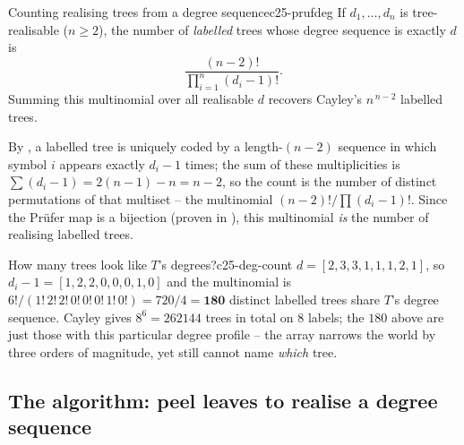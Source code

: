 \begin{proposition}{Counting realising trees from a degree sequence}{c25-prufdeg}
If $d_1,\dots,d_n$ is tree-realisable ($n\ge2$), the number of \emph{labelled} trees whose degree
sequence is exactly $d$ is
\[
  \frac{(n-2)!}{\prod_{i=1}^{n}(d_i-1)!}.
\]
Summing this multinomial over all realisable $d$ recovers Cayley's $n^{\,n-2}$ labelled trees.
\end{proposition}
\begin{proofbox}
By , a labelled tree is uniquely coded by a length-$(n-2)$ sequence in which
symbol $i$ appears exactly $d_i-1$ times; the sum of these multiplicities is
$\sum(d_i-1)=2(n-1)-n=n-2$, so the count is the number of distinct permutations of that multiset --
the multinomial $(n-2)!/\prod(d_i-1)!$. Since the Pr\"ufer map is a bijection (proven in
), this multinomial \emph{is} the number of realising labelled trees. \end{proofbox}

\begin{example}{How many trees look like $T$'s degrees?}{c25-deg-count}
$d=[2,3,3,1,1,1,2,1]$, so $d_i-1=[1,2,2,0,0,0,1,0]$ and the multinomial is
$6!/(1!\,2!\,2!\,0!\,0!\,0!\,1!\,0!)=720/4=\mathbf{180}$ distinct labelled trees share $T$'s degree
sequence. Cayley gives $8^{6}=262144$ trees in total on $8$ labels; the $180$ above are just those
with this particular degree profile -- the array narrows the world by three orders of magnitude, yet
still cannot name \emph{which} tree. \end{example}

\subsection{The algorithm: peel leaves to realise a degree sequence}

